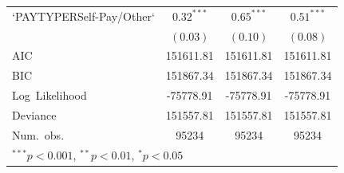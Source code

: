 \documentclass[12pt,twoside]{reedthesis}
\begin{document}
\begin{table}
\begin{center}
\begin{footnotesize}
\begin{tabular}{l c c c }
  `PAYTYPERSelf-Pay/Other` & $\mathbf{0.32}^{***}$  & $\mathbf{0.65}^{***}$  & $\mathbf{0.51}^{***}$  \\
                           & $(0.03)$               & $(0.10)$               & $(0.08)$               \\
  \hline
  AIC                      & 151611.81              & 151611.81              & 151611.81              \\
  BIC                      & 151867.34              & 151867.34              & 151867.34              \\
  Log\ Likelihood          & -75778.91              & -75778.91              & -75778.91              \\
  Deviance                 & 151557.81              & 151557.81              & 151557.81              \\
  Num.\ obs.               & 95234                  & 95234                  & 95234                  \\
  \hline
  \multicolumn{4}{l}{\tiny{$^{***}p<0.001$, $^{**}p<0.01$, $^*p<0.05$}}
  \end{tabular}
  \end{footnotesize}
  \label{table:coefficients}
  \end{center}
  \end{table}
  
\end{document}
